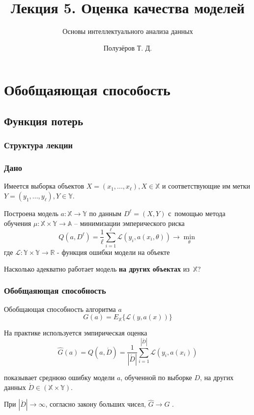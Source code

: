\documentclass{beamer}
\title[Метрики]{Лекция 5. Оценка качества моделей}
\subtitle{Основы интеллектуального анализа данных}
\author{Полузёров Т. Д.}
\institute{БГУ ФПМИ}
\date{}
\begin{document}
	
	\begin{frame}
		\titlepage
	\end{frame}
	
	\section{Обобщаяющая способость}
	
	\subsection{Функция потерь}
	
	\begin{center}
		\frametitle{Структура лекции}
		\tableofcontents	
	\end{center}

	\begin{frame}
		\frametitle{Дано}
		Имеется выборка объектов $X = (x_1, ..., x_{\ell}), X \in \mathbb{X}$ и соответствующие им метки $Y = (y_1, ..., y_{\ell}), Y \in \mathbb{Y}$.
		
		\vspace{5pt}
		
		Построена модель $a: \mathbb{X} \rightarrow \mathbb{Y}$ по данным $D^{\ell} = (X, Y)$ с~помощью метода обучения $\mu: \mathbb{X} \times \mathbb{Y} \rightarrow \mathbb{A}$ -- минимизации эмперического риска
		\[
		Q(a, D^{\ell}) = \frac{1}{\ell} \sum_{i=1}^{\ell} \mathcal{L}(y_i, a(x_i, \theta))
		\rightarrow \min_{\theta}
		\]
		где $\mathcal{L}: \mathbb{Y} \times \mathbb{Y} \rightarrow \mathbb{R}$ - функция ошибки модели на объекте
		
		\vspace{15pt}
		
		Насколько адекватно работает модель \textbf{на других объектах} из~$\mathbb{X}$?	
	\end{frame}
	
	\begin{frame}
		\frametitle{Обобщаяющая способность}
		
		Обобщающая способность алгоритма $a$
		\[
		G(a) = E_{\mathbb{X}}\{\mathcal{L}(y, a(x))\}
		\]
		
		На практике используется эмпирическая оценка   
		\[
		\hat{G}(a) = 
		Q(a, \acute{D}) 
		= \frac{1}{|\acute{D}|} 
		\sum_{i=1}^{|\acute{D}|} 
		\mathcal{L}(y_i, a(x_i))
		\]
		
		показывает среднюю ошибку модели $a$, обученной по выборке $D$, на других данных $\acute{D} \in (\mathbb{X} \times \mathbb{Y})$.
		
		При $|\acute{D}| \rightarrow \infty$, согласно закону больших чисел, $\hat{G} \rightarrow G$ .
	\end{frame}
	
\end{document}
